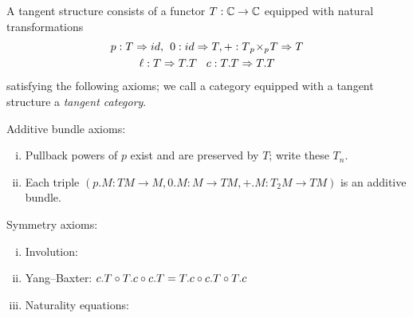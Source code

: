\begin{definition}\label{def:tangent-cat}
 A tangent structure consists of a functor $T:\mathbb{C} \to \mathbb{C}$ equipped with natural transformations
  \begin{gather*}
    p:T \Rightarrow id, \hspace{0.15cm} 0:id \Rightarrow T, +: T{_{p}}\!\times_{p}\! T \Rightarrow T \\
    \ell: T \Rightarrow T.T \hspace{0.30cm} c:T.T \Rightarrow T.T
  \end{gather*}
  satisfying the following axioms; we call a category equipped with a tangent structure a \emph{tangent category}.
  \begin{enumerate}[{[TC.1]}]
  \item Additive bundle axioms:
    \begin{enumerate}[(i)]
        \item Pullback powers of $p$ exist and are preserved by $T$; write these $T_n$.
        \item Each triple $(p.M: TM \to M, 0.M:M \to TM, +.M:T_2M \to TM)$ is an additive bundle.
        \begin{equation}
            \label{eq:abun-axioms}
            
        \end{equation}
    \end{enumerate}
  \item Symmetry axioms:
    \begin{enumerate}[(i)]
        \item Involution: 
        \begin{equation}\label{eq:tc-2-1}
            
        \end{equation}
        \item Yang--Baxter: $c.T \circ T.c \circ c.T = T.c \circ c.T \circ T.c$
        \begin{equation}\label{eq:tc-2-2}
            
        \end{equation}
        \item Naturality equations:
        \begin{equation}\label{eq:tc-2-3}
            

\end{equation}
\end{enumerate}
\end{enumerate}
\end{definition}
